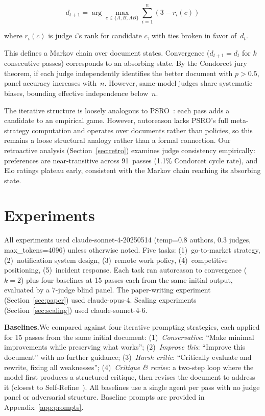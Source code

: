 \documentclass[10pt,twocolumn]{article}
\begin{document}
$$d_{t+1} = \arg\max_{c \in \{A, B, AB\}} \sum_{i=1}^{n} (3 - r_i(c))$$

where $r_i(c)$ is judge $i$'s rank for candidate $c$, with ties broken in favor of~$d_t$.

This defines a Markov chain over document states. Convergence ($d_{t+1} = d_t$ for $k$ consecutive passes) corresponds to an absorbing state. By the Condorcet jury theorem, if each judge independently identifies the better document with $p > 0.5$, panel accuracy increases with~$n$. However, same-model judges share systematic biases, bounding effective independence below~$n$.

The iterative structure is loosely analogous to PSRO~\cite{psro}: each pass adds a candidate to an empirical game. However, autoreason lacks PSRO's full meta-strategy computation and operates over documents rather than policies, so this remains a loose structural analogy rather than a formal connection. Our retroactive analysis (Section~\ref{sec:retro}) examines judge consistency empirically: preferences are near-transitive across 91~passes (1.1\% Condorcet cycle rate), and Elo ratings plateau early, consistent with the Markov chain reaching its absorbing state.

\section{Experiments}

All experiments used claude-sonnet-4-20250514 (temp=0.8 authors, 0.3 judges, max\_tokens=4096) unless otherwise noted. Five tasks: (1)~go-to-market strategy, (2)~notification system design, (3)~remote work policy, (4)~competitive positioning, (5)~incident response. Each task ran autoreason to convergence ($k{=}2$) plus four baselines at 15 passes each from the same initial output, evaluated by a 7-judge blind panel. The paper-writing experiment (Section~\ref{sec:paper}) used claude-opus-4. Scaling experiments (Section~\ref{sec:scaling}) used claude-sonnet-4-6.

\textbf{Baselines.}\enspace We compared against four iterative prompting strategies, each applied for 15 passes from the same initial document: (1)~\textit{Conservative}: ``Make minimal improvements while preserving what works''; (2)~\textit{Improve this}: ``Improve this document'' with no further guidance; (3)~\textit{Harsh critic}: ``Critically evaluate and rewrite, fixing all weaknesses''; (4)~\textit{Critique \& revise}: a two-step loop where the model first produces a structured critique, then revises the document to address it (closest to Self-Refine~\cite{selfrefine}). All baselines use a single agent per pass with no judge panel or adversarial structure. Baseline prompts are provided in Appendix~\ref{app:prompts}.
\end{document}
